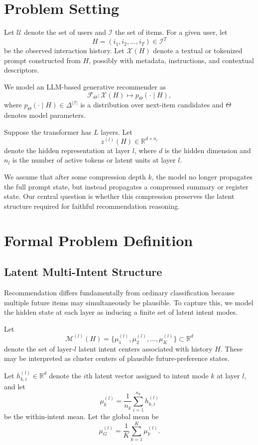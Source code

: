 \documentclass[11pt]{article}
\newcommand{\R}{\mathbb{R}}
\newcommand{\I}{\mathcal{I}}
\newcommand{\U}{\mathcal{U}}
\begin{document}
\section{Problem Setting}

Let $\U$ denote the set of users and $\I$ the set of items. For a given user, let
\[
H = (i_1, i_2, \dots, i_T) \in \I^T
\]
be the observed interaction history. Let $\mathcal{X}(H)$ denote a textual or tokenized prompt constructed from $H$, possibly with metadata, instructions, and contextual descriptors.

We model an LLM-based generative recommender as
\[
\mathcal{F}_{\Theta}: \mathcal{X}(H) \mapsto p_{\Theta}(\cdot \mid H),
\]
where $p_{\Theta}(\cdot \mid H) \in \Delta^{|\I|}$ is a distribution over next-item candidates and $\Theta$ denotes model parameters.

Suppose the transformer has $L$ layers. Let
\[
z^{(l)}(H) \in \R^{d \times n_l}
\]
denote the hidden representation at layer $l$, where $d$ is the hidden dimension and $n_l$ is the number of active tokens or latent units at layer $l$.

We assume that after some compression depth $k$, the model no longer propagates the full prompt state, but instead propagates a compressed summary or register state. Our central question is whether this compression preserves the latent structure required for faithful recommendation reasoning.

\section{Formal Problem Definition}

\subsection{Latent Multi-Intent Structure}

Recommendation differs fundamentally from ordinary classification because multiple future items may simultaneously be plausible. To capture this, we model the hidden state at each layer as inducing a finite set of latent intent modes.

Let
\[
\mathcal{M}^{(l)}(H) = \{\mu_1^{(l)}, \mu_2^{(l)}, \dots, \mu_K^{(l)}\} \subset \R^d
\]
denote the set of layer-$l$ latent intent centers associated with history $H$. These may be interpreted as cluster centers of plausible future-preference states.

Let $h_{k,i}^{(l)} \in \R^d$ denote the $i$th latent vector assigned to intent mode $k$ at layer $l$, and let
\[
\mu_k^{(l)} = \frac{1}{n_k}\sum_{i=1}^{n_k} h_{k,i}^{(l)}
\]
be the within-intent mean. Let the global mean be
\[
\mu_G^{(l)} = \frac{1}{K}\sum_{k=1}^K \mu_k^{(l)}.
\]
\end{document}
